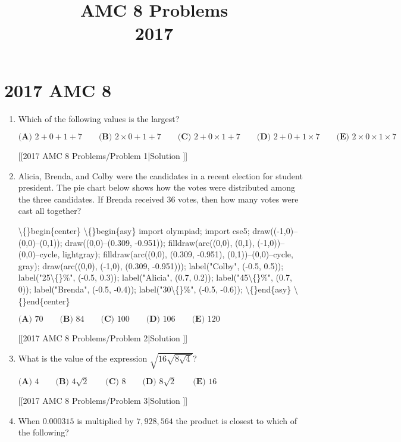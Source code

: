 \documentclass{article}
\title{AMC 8 Problems \\ 2017}
\date{}
\begin{document}
\maketitle\thispagestyle{fancy}\newpage\section*{2017 AMC 8}\begin{enumerate}[label=\arabic*., itemsep=0.5em]\item Which of the following values is the largest?

\(\textbf{(A) }2+0+1+7\qquad\textbf{(B) }2 \times 0 +1+7\qquad\textbf{(C) }2+0 \times 1 + 7\qquad\textbf{(D) }2+0+1 \times 7\qquad\textbf{(E) }2 \times 0 \times 1 \times 7\)

[[2017 AMC 8 Problems/Problem 1|Solution
]]\par \vspace{0.5em}\item Alicia, Brenda, and Colby were the candidates in a recent election for student president. The pie chart below shows how the votes were distributed among the three candidates. If Brenda received \(36\) votes, then how many votes were cast all together?


\textbackslash\{\}begin\{center\}
\textbackslash\{\}begin\{asy\}
import olympiad;
import cse5;
draw((-1,0)--(0,0)--(0,1));
draw((0,0)--(0.309, -0.951));
filldraw(arc((0,0), (0,1), (-1,0))--(0,0)--cycle, lightgray);
filldraw(arc((0,0), (0.309, -0.951), (0,1))--(0,0)--cycle, gray);
draw(arc((0,0), (-1,0), (0.309, -0.951)));
label("Colby", (-0.5, 0.5));
label("25\textbackslash\{\}\%", (-0.5, 0.3));
label("Alicia", (0.7, 0.2));
label("45\textbackslash\{\}\%", (0.7, 0));
label("Brenda", (-0.5, -0.4));
label("30\textbackslash\{\}\%", (-0.5, -0.6));
\textbackslash\{\}end\{asy\}
\textbackslash\{\}end\{center\}


\(\textbf{(A) }70\qquad\textbf{(B) }84\qquad\textbf{(C) }100\qquad\textbf{(D) }106\qquad\textbf{(E) }120\)

[[2017 AMC 8 Problems/Problem 2|Solution
]]\par \vspace{0.5em}\item What is the value of the expression \(\sqrt{16\sqrt{8\sqrt{4}}}\)?

\(\textbf{(A) }4\qquad\textbf{(B) }4\sqrt{2}\qquad\textbf{(C) }8\qquad\textbf{(D) }8\sqrt{2}\qquad\textbf{(E) }16\)

[[2017 AMC 8 Problems/Problem 3|Solution
]]\par \vspace{0.5em}\item When \(0.000315\) is multiplied by \(7,928,564\) the product is closest to which of the following?


\end{enumerate}
\end{document}
